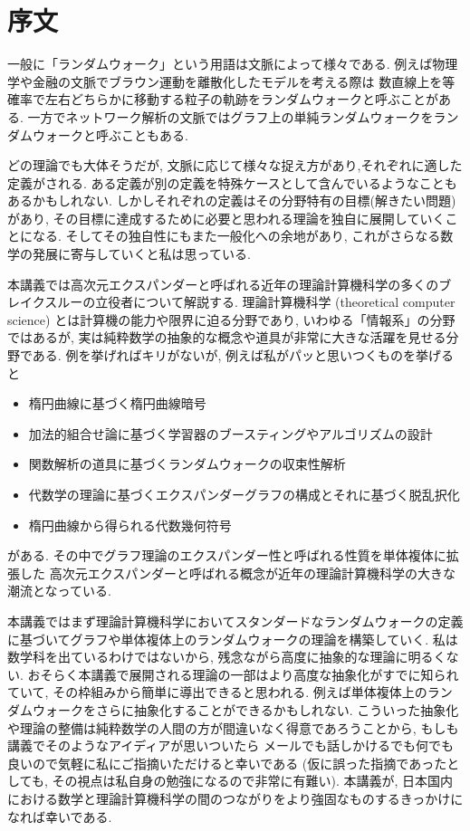\chapter*{序文}
一般に「ランダムウォーク」という用語は文脈によって様々である.
例えば物理学や金融の文脈でブラウン運動を離散化したモデルを考える際は
数直線上を等確率で左右どちらかに移動する粒子の軌跡をランダムウォークと呼ぶことがある.
一方でネットワーク解析の文脈ではグラフ上の単純ランダムウォークをランダムウォークと呼ぶこともある.

どの理論でも大体そうだが, 文脈に応じて様々な捉え方があり,それぞれに適した定義がされる.
ある定義が別の定義を特殊ケースとして含んでいるようなこともあるかもしれない.
しかしそれぞれの定義はその分野特有の目標(解きたい問題)があり,
    その目標に達成するために必要と思われる理論を独自に展開していくことになる.
    そしてその独自性にもまた一般化への余地があり,
    これがさらなる数学の発展に寄与していくと私は思っている.

本講義では高次元エクスパンダーと呼ばれる近年の理論計算機科学の多くのブレイクスルーの立役者について解説する.
理論計算機科学 (theoretical computer science) とは計算機の能力や限界に迫る分野であり, いわゆる「情報系」の分野ではあるが,
    実は純粋数学の抽象的な概念や道具が非常に大きな活躍を見せる分野である.
例を挙げればキリがないが, 例えば私がパッと思いつくものを挙げると
\begin{itemize}
    \item 楕円曲線に基づく楕円曲線暗号
    \item 加法的組合せ論に基づく学習器のブースティングやアルゴリズムの設計
    \item 関数解析の道具に基づくランダムウォークの収束性解析
    \item 代数学の理論に基づくエクスパンダーグラフの構成とそれに基づく脱乱択化
    \item 楕円曲線から得られる代数幾何符号
\end{itemize}
がある.
その中でグラフ理論のエクスパンダー性と呼ばれる性質を単体複体に拡張した
    高次元エクスパンダーと呼ばれる概念が近年の理論計算機科学の大きな潮流となっている.

本講義ではまず理論計算機科学においてスタンダードなランダムウォークの定義に基づいてグラフや単体複体上のランダムウォークの理論を構築していく.
私は数学科を出ているわけではないから, 残念ながら高度に抽象的な理論に明るくない.
おそらく本講義で展開される理論の一部はより高度な抽象化がすでに知られていて, その枠組みから簡単に導出できると思われる.
例えば単体複体上のランダムウォークをさらに抽象化することができるかもしれない.
こういった抽象化や理論の整備は純粋数学の人間の方が間違いなく得意であろうことから,
もしも講義でそのようなアイディアが思いついたら
メールでも話しかけるでも何でも良いので気軽に私にご指摘いただけると幸いである
(仮に誤った指摘であったとしても, その視点は私自身の勉強になるので非常に有難い).
本講義が, 日本国内における数学と理論計算機科学の間のつながりをより強固なものするきっかけになれば幸いである.